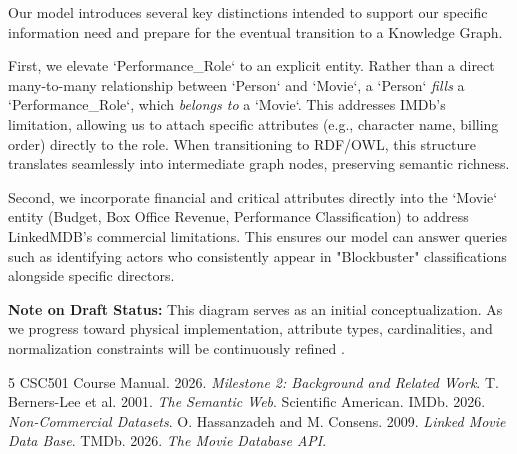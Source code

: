 \documentclass[sigconf]{acmart}
\begin{document}
Our model introduces several key distinctions intended to support our specific information need and prepare for the eventual transition to a Knowledge Graph. 

First, we elevate `Performance\_Role` to an explicit entity. Rather than a direct many-to-many relationship between `Person` and `Movie`, a `Person` \textit{fills} a `Performance\_Role`, which \textit{belongs to} a `Movie`. This addresses IMDb's limitation, allowing us to attach specific attributes (e.g., character name, billing order) directly to the role. When transitioning to RDF/OWL, this structure translates seamlessly into intermediate graph nodes, preserving semantic richness.

Second, we incorporate financial and critical attributes directly into the `Movie` entity (Budget, Box Office Revenue, Performance Classification) to address LinkedMDB's commercial limitations. This ensures our model can answer queries such as identifying actors who consistently appear in "Blockbuster" classifications alongside specific directors. 

\textbf{Note on Draft Status:} This diagram serves as an initial conceptualization. As we progress toward physical implementation, attribute types, cardinalities, and normalization constraints will be continuously refined \cite{course}.


\begin{thebibliography}{5}
 CSC501 Course Manual. 2026. \emph{Milestone 2: Background and Related Work}.
 T. Berners-Lee et al. 2001. \emph{The Semantic Web}. Scientific American.
 IMDb. 2026. \emph{Non-Commercial Datasets}.
 O. Hassanzadeh and M. Consens. 2009. \emph{Linked Movie Data Base}.
 TMDb. 2026. \emph{The Movie Database API}.
\end{thebibliography}

\clearpage
\end{document}
